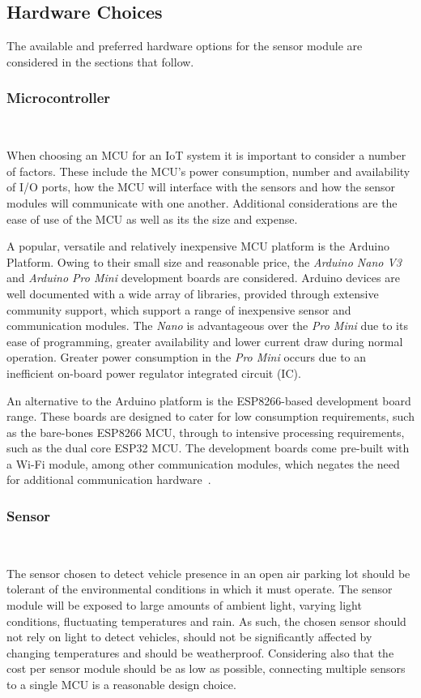 \documentclass[10pt,twocolumn]{witseiepaper}
\begin{document}
	\subsection{Hardware Choices} 
	
		The available and preferred hardware options for the sensor module are considered in the sections that follow.
	
		\subsubsection{Microcontroller} $   $
		
			When choosing an MCU for an IoT system it is important to consider a number of factors. These include the MCU's power consumption, number and availability of I/O ports, how the MCU will interface with the sensors and how the sensor modules will communicate with one another. Additional considerations are the ease of use of the MCU as well as its the size and expense.
			
			A popular, versatile and relatively inexpensive MCU platform is the Arduino Platform. Owing to their small size and reasonable price, the \textit{Arduino Nano V3} and \textit{Arduino Pro Mini} development boards are considered. Arduino devices are well documented with a wide array of libraries, provided through extensive community support, which support a range of inexpensive sensor and communication modules. The \textit{Nano} is advantageous over the \textit{Pro Mini} due to its ease of programming, greater availability and lower current draw during normal operation. Greater power consumption in the \textit{Pro Mini} occurs due to an inefficient on-board power regulator integrated circuit (IC).

			An alternative to the Arduino platform is the ESP8266-based development board range. 
			These boards are designed to cater for low consumption requirements, such as the bare-bones ESP8266 MCU, through to intensive processing requirements, such as the dual core ESP32 MCU. The development boards come pre-built with a \mbox{Wi-Fi} module, among other communication modules, which negates the need for additional communication hardware~\cite{esp12e}.
			
		\subsubsection{Sensor} $   $
			
			The sensor chosen to detect vehicle presence in an open air parking lot should be tolerant of the environmental conditions in which it must operate. The sensor module will be exposed to large amounts of ambient light, varying light conditions, fluctuating temperatures and rain. As such, the chosen sensor should not rely on light to detect vehicles, should not be significantly affected by changing temperatures and should be weatherproof. Considering also that the cost per sensor module should be as low as possible, connecting multiple sensors to a single MCU is a reasonable design choice.
			
\end{document}
